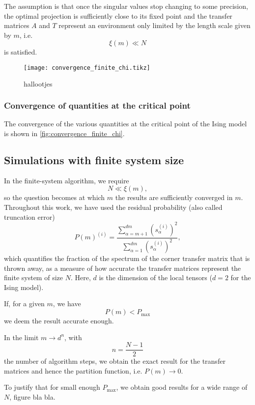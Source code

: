 The assumption is that once the singular values stop changing to some precision, the optimal projection is sufficiently
close to its fixed point and the transfer matrices $A$ and $T$ represent an environment only limited by the length scale
given by $m$, i.e.
\begin{equation}
  \xi(m) \ll N
\end{equation}
is satisfied.

\begin{figure}
  \texttt{[image: convergence\_finite\_chi.tikz]}
  \caption{hallootjes}\label{fig:convergence_finite_chi}
\end{figure}

\subsubsection{Convergence of quantities at the critical point}
The convergence of the various quantities at the critical point of the Ising model is shown in
\autoref{fig:convergence_finite_chi}.




\subsection{Simulations with finite system size}
In the finite-system algorithm, we require
\begin{equation}
  N \ll \xi(m),
\end{equation}
so the question becomes at which $m$ the results are sufficiently converged in $m$. Throughout this work, we have used
the residual probability (also called truncation error)
\begin{equation}
  P(m)^{(i)} = \frac{\sum_{\alpha = m + 1}^{dm} (s_{\alpha}^{(i)})^2 }{ \sum_{\alpha = 1}^{dm} (s_{\alpha}^{(i)})^2 },
\end{equation}
which quantifies the fraction of the spectrum of the corner transfer matrix that is thrown away, as a measure of how
accurate the transfer matrices represent the finite system of size $N$. Here, $d$ is the
dimension of the local tensors ($d = 2$ for the Ising model).

If, for a given $m$, we have
\begin{equation}
  P(m) < P_{\text{max}}
\end{equation}
we deem the result accurate enough.

In the limit $m \to d^n$, with
\begin{equation}
  n = \frac{N - 1}{2}
\end{equation}
the number of algorithm steps, we obtain the exact result for the transfer matrices and hence the partition function,
i.e. $P(m) \to 0$.

To justify that for small enough $P_{\max}$, we obtain good results for a wide range of $N$, figure bla bla.
